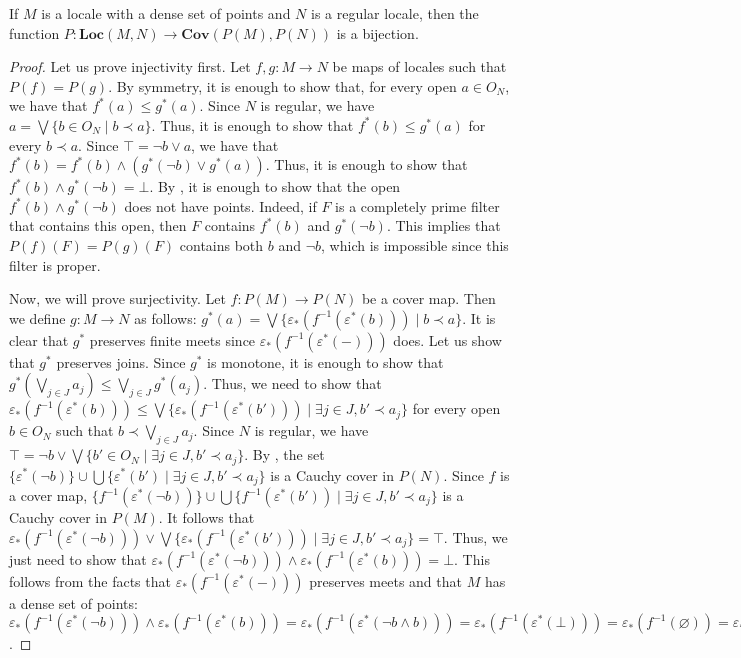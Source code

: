 \documentclass[reqno]{amsart}
\theoremstyle{definition}
\theoremstyle{remark}
\numberwithin{figure}{section}
\newcommand{\rb}{\prec}
\newcommand{\cat}[1]{\mathbf{#1}}
\begin{document}
\begin{prop}[locale-ff]
If $M$ is a locale with a dense set of points and $N$ is a regular locale, then the function $P : \cat{Loc}(M,N) \to \cat{Cov}(P(M),P(N))$ is a bijection.
\end{prop}
\begin{proof}
Let us prove injectivity first.
Let $f,g : M \to N$ be maps of locales such that $P(f) = P(g)$.
By symmetry, it is enough to show that, for every open $a \in O_N$, we have that $f^*(a) \leq g^*(a)$.
Since $N$ is regular, we have $a = \bigvee \{ b \in O_N \mid b \rb a \}$.
Thus, it is enough to show that $f^*(b) \leq g^*(a)$ for every $b \rb a$.
Since $\top = \neg b \vee a$, we have that $f^*(b) = f^*(b) \wedge (g^*(\neg b) \vee g^*(a))$.
Thus, it is enough to show that $f^*(b) \wedge g^*(\neg b) = \bot$.
By , it is enough to show that the open $f^*(b) \wedge g^*(\neg b)$ does not have points.
Indeed, if $F$ is a completely prime filter that contains this open, then $F$ contains $f^*(b)$ and $g^*(\neg b)$.
This implies that $P(f)(F) = P(g)(F)$ contains both $b$ and $\neg b$, which is impossible since this filter is proper.

Now, we will prove surjectivity.
Let $f : P(M) \to P(N)$ be a cover map.
Then we define $g : M \to N$ as follows: $g^*(a) = \bigvee \{ \varepsilon_*(f^{-1}(\varepsilon^*(b))) \mid b \rb a \}$.
It is clear that $g^*$ preserves finite meets since $\varepsilon_*(f^{-1}(\varepsilon^*(-)))$ does.
Let us show that $g^*$ preserves joins.
Since $g^*$ is monotone, it is enough to show that $g^*(\bigvee_{j \in J} a_j) \leq \bigvee_{j \in J} g^*(a_j)$.
Thus, we need to show that $\varepsilon_*(f^{-1}(\varepsilon^*(b))) \leq \bigvee \{ \varepsilon_*(f^{-1}(\varepsilon^*(b'))) \mid \exists j \in J, b' \rb a_j \}$ for every open $b \in O_N$ such that $b \rb \bigvee_{j \in J} a_j$.
Since $N$ is regular, we have $\top = \neg b \vee \bigvee \{ b' \in O_N \mid \exists j \in J, b' \rb a_j \}$.
By , the set $\{ \varepsilon^*(\neg b) \} \cup \bigcup \{ \varepsilon^*(b') \mid \exists j \in J, b' \rb a_j \}$ is a Cauchy cover in $P(N)$.
Since $f$ is a cover map, $\{ f^{-1}(\varepsilon^*(\neg b)) \} \cup \bigcup \{ f^{-1}(\varepsilon^*(b')) \mid \exists j \in J, b' \rb a_j \}$ is a Cauchy cover in $P(M)$.
It follows that $\varepsilon_*(f^{-1}(\varepsilon^*(\neg b))) \vee \bigvee \{ \varepsilon_*(f^{-1}(\varepsilon^*(b'))) \mid \exists j \in J, b' \rb a_j \} = \top$.
Thus, we just need to show that $\varepsilon_*(f^{-1}(\varepsilon^*(\neg b))) \wedge \varepsilon_*(f^{-1}(\varepsilon^*(b))) = \bot$.
This follows from the facts that $\varepsilon_*(f^{-1}(\varepsilon^*(-)))$ preserves meets and that $M$ has a dense set of points: $\varepsilon_*(f^{-1}(\varepsilon^*(\neg b))) \wedge \varepsilon_*(f^{-1}(\varepsilon^*(b))) = \varepsilon_*(f^{-1}(\varepsilon^*(\neg b \wedge b))) = \varepsilon_*(f^{-1}(\varepsilon^*(\bot))) = \varepsilon_*(f^{-1}(\varnothing)) = \varepsilon_*(\varnothing) = \bot$.


\end{proof}
\end{document}
